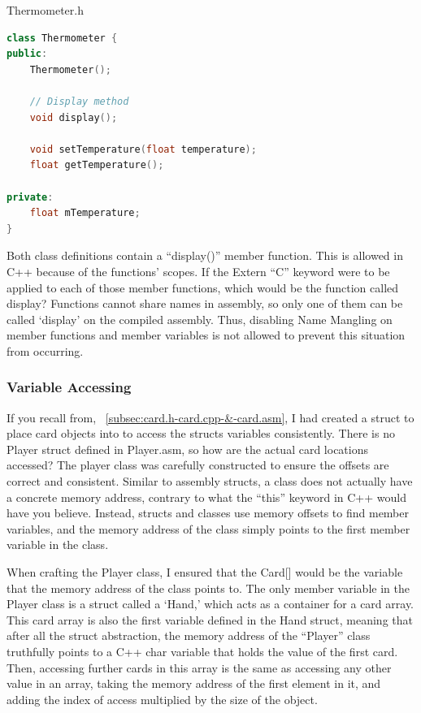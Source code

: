 \documentclass[twoside]{article}
\begin{document}
    \noindent
    Thermometer.h
    \begin{lstlisting}[language=C++,label={lst:ThermometerClass}]
class Thermometer {
public:
    Thermometer();

    // Display method
    void display();

    void setTemperature(float temperature);
    float getTemperature();

private:
    float mTemperature;
}
    \end{lstlisting}

    \bigbreak
    \noindent
    Both class definitions contain a ``display()'' member function.
    This is allowed in C++ because of the functions' scopes.
    If the Extern ``C'' keyword were to be applied to each of those member functions, which would be the function called display?
    Functions cannot share names in assembly, so only one of them can be called `display' on the compiled assembly.
    Thus, disabling Name Mangling on member functions and member variables is not allowed to prevent this situation from occurring.

    \subsubsection{Variable Accessing}
    \noindent
    If you recall from, ~\ref{subsec:card.h-card.cpp-&-card.asm}, I had created a struct to place card objects into to access the structs variables consistently.
    There is no Player struct defined in Player.asm, so how are the actual card locations accessed?
    The player class was carefully constructed to ensure the offsets are correct and consistent.
    Similar to assembly structs, a class does not actually have a concrete memory address, contrary to what the ``this'' keyword in C++ would have you believe.
    Instead, structs and classes use memory offsets to find member variables, and the memory address of the class simply points to the first member variable in the class.

    \bigbreak
    \noindent
    When crafting the Player class, I ensured that the Card[] would be the variable that the memory address of the class points to.
    The only member variable in the Player class is a struct called a `Hand,' which acts as a container for a card array.
    This card array is also the first variable defined in the Hand struct, meaning that after all the struct abstraction, the memory address of the ``Player'' class truthfully points to a C++ char variable that holds the value of the first card.
    Then, accessing further cards in this array is the same as accessing any other value in an array, taking the memory address of the first element in it, and adding the index of access multiplied by the size of the object.
\end{document}
